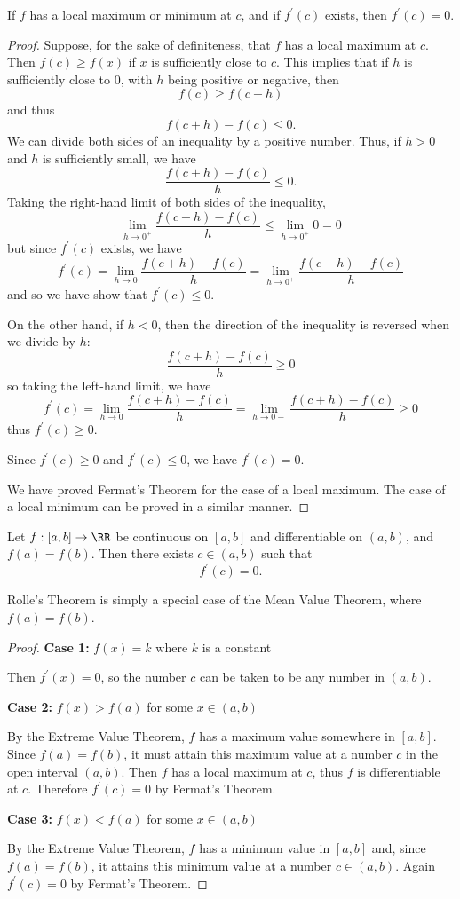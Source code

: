 \begin{theorem}
If $f$ has a local maximum or minimum at $c$, and if $f^\prime(c)$ exists, then $f^\prime(c)=0$.
\end{theorem}

\begin{proof}
Suppose, for the sake of definiteness, that $f$ has a local maximum at $c$. Then $f(c)\ge f(x)$ if $x$ is sufficiently close to $c$. This implies that if $h$ is sufficiently close to $0$, with $h$ being positive or negative, then
\[ f(c)\ge f(c+h) \]
and thus
\[ f(c+h)-f(c)\le0. \]
We can divide both sides of an inequality by a positive number. Thus, if $h>0$ and $h$ is sufficiently small, we have
\[ \frac{f(c+h)-f(c)}{h}\le0. \]
Taking the right-hand limit of both sides of the inequality,
\[ \lim_{h\to0^+}\frac{f(c+h)-f(c)}{h}\le\lim_{h\to0^+}0=0 \]
but since $f^\prime(c)$ exists, we have
\[ f^\prime(c)=\lim_{h\to0}\frac{f(c+h)-f(c)}{h}=\lim_{h\to0^+}\frac{f(c+h)-f(c)}{h} \]
and so we have show that $f^\prime(c)\le0$.

On the other hand, if $h<0$, then the direction of the inequality is reversed when we divide by $h$:
\[ \frac{f(c+h)-f(c)}{h}\ge0 \]
so taking the left-hand limit, we have
\[ f^\prime(c)=\lim_{h\to0}\frac{f(c+h)-f(c)}{h}=\lim_{h\to0-}\frac{f(c+h)-f(c)}{h}\ge0 \]
thus $f^\prime(c)\ge0$.

Since $f^\prime(c)\ge0$ and $f^\prime(c)\le0$, we have $f^\prime(c)=0$.

We have proved Fermat's Theorem for the case of a local maximum. The case of a local minimum can be proved in a similar manner.
\end{proof}

\begin{theorem}
Let $f:[a,b]\to\RR$ be continuous on $[a,b]$ and differentiable on $(a,b)$, and $f(a)=f(b)$. Then there exists $c \in (a,b)$ such that 
\[ f^\prime(c)=0. \]
\end{theorem}
\begin{remark}
Rolle's Theorem is simply a special case of the Mean Value Theorem, where $f(a)=f(b)$.
\end{remark}

\begin{proof}
\textbf{Case 1:} $f(x)=k$ where $k$ is a constant

Then $f^\prime(x)=0$, so the number $c$ can be taken to be any number in $(a,b)$.

\textbf{Case 2:} $f(x)>f(a)$ for some $x\in(a,b)$

By the Extreme Value Theorem, $f$ has a maximum value somewhere in $[a,b]$. Since $f(a)=f(b)$, it must attain this maximum value at a number $c$ in the open interval $(a,b)$. Then $f$ has a local maximum at $c$, thus $f$ is differentiable at $c$. Therefore $f^\prime(c)=0$ by Fermat's Theorem.

\textbf{Case 3:} $f(x)<f(a)$ for some $x\in(a,b)$

By the Extreme Value Theorem, $f$ has a minimum value in $[a,b]$ and, since $f(a)=f(b)$, it attains this minimum value at a number $c\in(a,b)$. Again $f^\prime(c)=0$ by Fermat's Theorem.
\end{proof}

